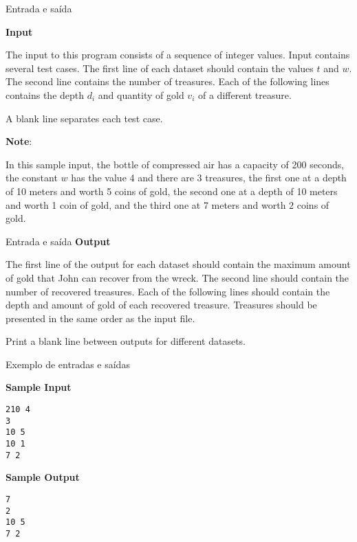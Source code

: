 \begin{frame}[fragile]{Entrada e saída}

\textbf{Input}

The input to this program consists of a sequence of integer values. Input contains several test 
cases. The first line of each dataset should contain the values $t$ and $w$. The second line 
contains the number of treasures. Each of the following lines contains the depth $d_i$ and 
quantity of gold $v_i$ of a different treasure.

A blank line separates each test case.

\textbf{Note}:

In this sample input, the bottle of compressed air has a capacity of 200 seconds, the constant 
$w$ has the value 4 and there are 3 treasures, the first one at a depth of 10 meters and worth 
5 coins of gold, the second one at a depth of 10 meters and worth 1 coin of gold, and the third 
one at 7 meters and worth 2 coins of gold.

\end{frame}


\begin{frame}[fragile]{Entrada e saída}
\textbf{Output}

The first line of the output for each dataset should contain the maximum amount of gold that 
John can recover from the wreck. The second line should contain the number of recovered 
treasures. Each of the following lines should contain the depth and amount of gold of each 
recovered treasure. Treasures should be presented in the same order as the input file.

Print a blank line between outputs for different datasets.

\end{frame}

\begin{frame}[fragile]{Exemplo de entradas e saídas}

\begin{minipage}[t]{0.55\textwidth}
\textbf{Sample Input}
\begin{verbatim}
210 4
3
10 5
10 1
7 2
\end{verbatim}
\end{minipage}
\begin{minipage}[t]{0.4\textwidth}
\textbf{Sample Output}
\begin{verbatim}
7
2
10 5
7 2
\end{verbatim}
\end{minipage}
\end{frame}

